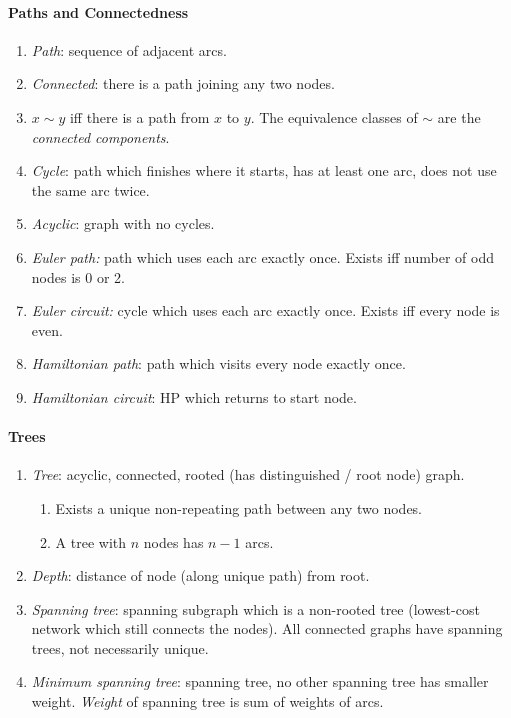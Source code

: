 \documentclass[twocolumn,english]{article}
\begin{document}
\paragraph{Paths and Connectedness}
\begin{enumerate}
\item \emph{Path}: sequence of adjacent arcs.
\item \emph{Connected}: there is a path joining any two nodes.
\item $x\sim y$ iff there is a path from $x$ to $y$. The equivalence
classes of $\sim$ are the \emph{connected components}.
\item \emph{Cycle}: path which finishes where it starts, has at least one
arc, does not use the same arc twice.
\item \emph{Acyclic}: graph with no cycles.
\item \emph{Euler path:} path which uses each arc exactly once. Exists iff
number of odd nodes is 0 or 2.
\item \emph{Euler circuit:} cycle which uses each arc exactly once. Exists
iff every node is even.
\item \emph{Hamiltonian path}: path which visits every node exactly once.
\item \emph{Hamiltonian circuit}: HP which returns to start node.
\end{enumerate}

\paragraph{Trees}
\begin{enumerate}
\item \emph{Tree}: acyclic, connected, rooted (has distinguished / root
node) graph.

\begin{enumerate}
\item Exists a unique non-repeating path between any two nodes.
\item A tree with $n$ nodes has $n-1$ arcs.
\end{enumerate}
\item \emph{Depth}: distance of node (along unique path) from root.
\item \emph{Spanning tree}: spanning subgraph which is a non-rooted tree
(lowest-cost network which still connects the nodes). All connected
graphs have spanning trees, not necessarily unique.
\item \emph{Minimum spanning tree}: spanning tree, no other spanning tree
has smaller weight. \emph{Weight} of spanning tree is sum of weights
of arcs.
\end{enumerate}
\end{document}
